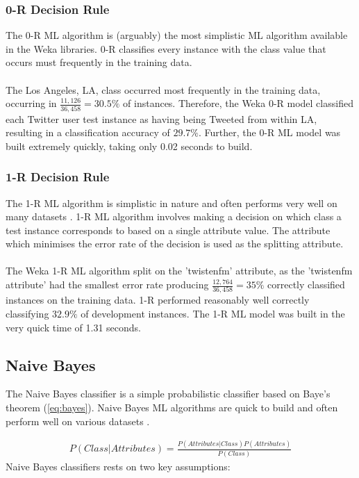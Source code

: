 \documentclass[11pt]{article}
\begin{document}
\subsubsection{0-R Decision Rule}

The 0-R ML algorithm is (arguably) the most simplistic ML algorithm available in the Weka libraries. 0-R classifies every instance with the class value that occurs must frequently in the training data.\\\\
The Los Angeles, LA, class occurred most frequently in the training data, occurring in $\frac{11,126}{36,458} = 30.5\%$ of instances. Therefore, the Weka 0-R model classified each Twitter user test instance as having being Tweeted from within LA, resulting in a classification accuracy of $29.7\%$. Further, the 0-R ML model was built extremely quickly, taking only 0.02 seconds to build.    

\subsubsection{1-R Decision Rule}

The 1-R ML algorithm is simplistic in nature and often performs very well on many datasets \cite{holte-1R}. 1-R ML algorithm involves making a decision on which class a test instance corresponds to based on a single attribute value. The attribute which minimises the error rate of the decision is used as the splitting attribute.\\\\
The Weka 1-R ML algorithm split on the 'twistenfm' attribute, as the 'twistenfm attribute' had the smallest error rate producing $\frac{12,764}{36,458} = 35\%$ correctly classified instances on the training data. 1-R performed reasonably well correctly classifying $32.9\%$ of development instances. The 1-R ML model was built in the very quick time of 1.31 seconds. 

\subsection{Naive Bayes}

The Naive Bayes classifier is a simple probabilistic classifier based on Baye's theorem (\ref{eq:bayes}). Naive Bayes ML algorithms are quick to build and often perform well on various datasets \cite{zhang-naive}.

\begin{gather*}
P(Class|Attributes) = \frac{P(Attributes|Class)P(Attributes)}{P(Class)} \tag{1}\label{eq:bayes}
\end{gather*}
Naive Bayes classifiers rests on two key assumptions:
\end{document}
